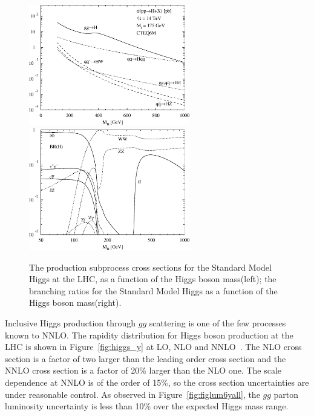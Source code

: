 \documentclass[12pt]{iopart}
\begin{document}
\begin{figure}[t]
\begin{center}
\includegraphics[width=7cm,angle=0]{Figure_010-003.eps}
\includegraphics[width=7cm,angle=0]{Figure_010-001-b.eps}
\end{center}
\vspace*{-0.5cm}
\caption{The production subprocess cross sections for the Standard Model Higgs at the LHC, as a function of the Higgs boson mass(left); the branching ratios for the Standard Model Higgs as a function of the Higgs boson mass(right).  
\label{fig:higgs}}
\end{figure}
%

Inclusive Higgs production through $gg$ scattering is one of the few processes known to NNLO. The rapidity distribution for Higgs boson production at the LHC is shown in Figure~\ref{fig:higgs_y} at LO, NLO and NNLO~\cite{Anastasiou:2004xq}. The NLO cross section is a factor of two larger than the leading order cross section and the NNLO cross section is a factor of 20\% larger than the NLO one. The scale dependence at NNLO is of the order of 15\%, so the cross section uncertainties are under reasonable control. As observed in Figure~\ref{fig:figlum6yall}, the $gg$ parton luminosity uncertainty is less than 10\% over the expected Higgs mass range. 
\end{document}
